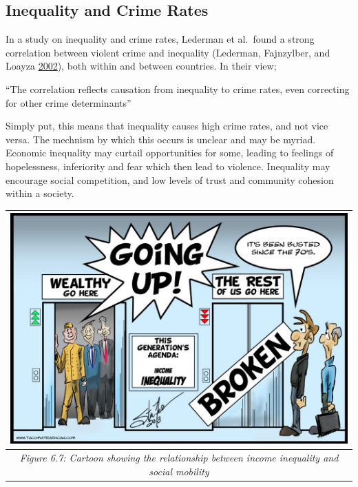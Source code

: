 \documentclass[]{tufte-handout}
\begin{document}
\hypertarget{inequality-and-crime-rates}{%
\subsection{Inequality and Crime
Rates}\label{inequality-and-crime-rates}}

In a study on inequality and crime rates, Lederman et al.~found a strong
correlation between violent crime and inequality (Lederman, Fajnzylber,
and Loayza \protect\hyperlink{ref-Lederman2002}{2002}), both within and
between countries. In their view;

``The correlation reflects causation from inequality to crime rates,
even correcting for other crime determinants''

Simply put, this means that inequality causes high crime rates, and not
vice versa. The mechnism by which this occurs is unclear and may be
myriad. Economic inequality may curtail opportunities for some, leading
to feelings of hopelessness, inferiority and fear which then lead to
violence. Inequality may encourage social competition, and low levels of
trust and community cohesion within a society.

\begin{longtable}[]{@{}c@{}}
\toprule
\begin{minipage}[b]{0.97\columnwidth}\centering
\includegraphics{ChapterPictures/6-6-IneqLift.jpg}\strut
\end{minipage}\tabularnewline
\midrule
\endhead
\begin{minipage}[t]{0.97\columnwidth}\centering
\emph{Figure 6.7: Cartoon showing the relationship between income
inequality and social mobility}\strut
\end{minipage}\tabularnewline
\bottomrule
\end{longtable}
\end{document}
